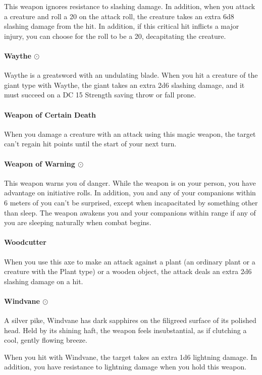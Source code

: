         This weapon ignores resistance to slashing damage.
        In addition, when you attack a creature and roll a 20 on the attack roll, the creature takes an extra 6d8 slashing damage from the hit.
        In addition, if this critical hit inflicts a major injury, you can choose for the roll to be a 20, decapitating the creature.
    \paragraph{Waythe $\odot$}
        Waythe is a greatsword with an undulating blade.
        When you hit a creature of the giant type with Waythe, the giant takes an extra 2d6 slashing damage, and it must succeed on a DC 15 Strength saving throw or fall prone.
    \paragraph{Weapon of Certain Death}
        When you damage a creature with an attack using this magic weapon, the target can't regain hit points until the start of your next turn.
    \paragraph{Weapon of Warning $\odot$}
        This weapon warns you of danger.
        While the weapon is on your person, you have advantage on initiative rolls.
        In addition, you and any of your companions within 6 meters of you can't be surprised, except when incapacitated by something other than sleep.
        The weapon awakens you and your companions within range if any of you are sleeping naturally when combat begins.
    \paragraph{Woodcutter}
        When you use this axe to make an attack against a plant (an ordinary plant or a creature with the Plant type) or a wooden object, the attack deals an extra 2d6 slashing damage on a hit.
    \paragraph{Windvane $\odot$}
        A silver pike, Windvane has dark sapphires on the filigreed surface of its polished head.
        Held by its shining haft, the weapon feels insubstantial, as if clutching a cool, gently flowing breeze.

        When you hit with Windvane, the target takes an extra 1d6 lightning damage.
        In addition, you have resistance to lightning damage when you hold this weapon.

